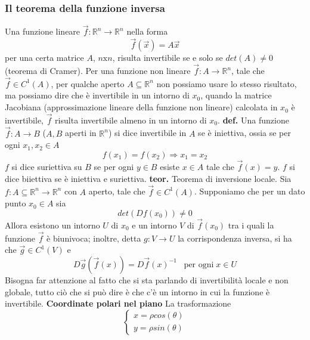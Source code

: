 \subsubsection*{Il teorema della funzione inversa}
Una funzione lineare $\vec{f}: \mathbb{R}^n \rightarrow \mathbb{R}^n$ nella forma
\[
    \vec{f}(\vec{x}) =A \vec{x}
\]
per una certa matrice $A$, $n \text{x} n$, risulta invertibile se e solo se $det(A)\neq 0$ (teorema di Cramer).\newline
\newline
Per una funzione non lineare $\vec{f}: A \rightarrow \mathbb{R}^n$, tale che $\vec{f}\in C^1(A)$, per qualche aperto $A \subseteq \mathbb{R}^n$ non possiamo usare lo stesso risultato, ma possiamo dire che è invertibile in un intorno di $x_0$, quando la matrice Jacobiana (approssimazione lineare della funzione non lineare) calcolata in $x_0$ è invertibile, $\vec{f}$ risulta invertibile almeno in un intorno di $x_0$.\newline
\newline
\textbf{def.} Una funzione $\vec{f}: A \rightarrow B$ ($A,B$ aperti in $\mathbb{R}^n$) si dice invertibile in $A$ se è iniettiva, ossia se per ogni $x_1, x_2 \in A$
\[
    f(x_1) = f(x_2) \Rightarrow x_1 = x_2
\]
$f$ si dice suriettiva su $B$ se per ogni $y \in B$ esiste $x \in A$ tale che $\vec{f} (x) = y$.\newline
$f$ si dice biiettiva se è iniettiva e suriettiva.\newline
\newline
\textbf{teor.} Teorema di inversione locale. Sia $f: A \subseteq \mathbb{R}^n \rightarrow \mathbb{R}^n$ con $A$ aperto, tale che $\vec{f} \in C^1(A)$. Supponiamo che per un dato punto $x_0 \in A$ sia
\[
    det(Df(x_0)) \neq 0
\]
Allora esistono un intorno $U$ di $x_0$ e un intorno $V$ di $\vec{f}(x_0)$ tra i quali  la funzione $\vec{f}$ è biunivoca; inoltre, detta $g: V \rightarrow U$ la corrispondenza inversa, si ha che $\vec{g}\in C^1(V)$ e 
\[
    D \vec{g}(\vec{f}(x)) = D \vec{f}(x)^{-1} \;\;\; \text{per ogni} \;x \in U
\]
Bisogna far attenzione al fatto che si sta parlando di invertibilità locale e non globale, tutto ciò che si può dire è che c'è un intorno in cui la funzione è invertibile.\newline
\newline
\textbf{Coordinate polari nel piano}\newline
La trasformazione
\[
    \begin{cases}
        x = \rho cos(\theta)\\
        y = \rho sin(\theta)
    \end{cases}
\]
